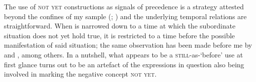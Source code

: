The use of \textsc{not yet} constructions as signals of precedence is a strategy attested beyond the confines of my sample (\cite[336–340]{OlguinMartinez2022}; \cite{VeselinovaDevos2021}) and the underlying temporal relations are straightforward. When  is narrowed down to a time at which the subordinate situation does not yet hold true, it is restricted to a time before the possible manifestation of said situation; the same observation has been made before me by \textcite[271]{Gordon1986} and \textcite[388]{Weber1989}, among others. In a nutshell, what appears to be a \textsc{still}-as-\lq before\rq{ }use at first glance turns out to be an artefact of the expressions in question also being involved in marking the negative concept \textsc{not yet}.
